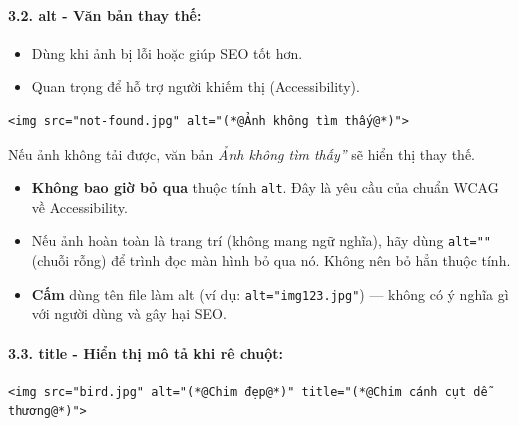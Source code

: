 \documentclass[11pt,oneside]{book}
\newcommand{\codeinline}[1]{\textcolor{accentOrange}{\texttt{#1}}}
\begin{document}
\paragraph{3.2. alt - Văn bản thay thế:}
\begin{itemize}[leftmargin=1.5em, itemsep=2pt, parsep=0pt]
    \item Dùng khi ảnh bị lỗi hoặc giúp SEO tốt hơn.
    \item Quan trọng để hỗ trợ người khiếm thị (Accessibility).
\end{itemize}

\begin{codeWindow}
\begin{lstlisting}[language=HTML5]
<img src="not-found.jpg" alt="(*@Ảnh không tìm thấy@*)">
\end{lstlisting}
\end{codeWindow}

Nếu ảnh không tải được, văn bản \textit{\codeinline{}Ảnh không tìm thấy''} sẽ hiển thị thay thế.

\begin{warnBox}
\begin{itemize}[leftmargin=1.5em, itemsep=2pt, parsep=0pt]
    \item \textbf{Không bao giờ bỏ qua} thuộc tính \codeinline{alt}. Đây là yêu cầu của chuẩn WCAG về Accessibility.
    \item Nếu ảnh hoàn toàn là trang trí (không mang ngữ nghĩa), hãy dùng \codeinline{alt=""} (chuỗi rỗng) để trình đọc màn hình bỏ qua nó. Không nên bỏ hẳn thuộc tính.
    \item \textbf{Cấm} dùng tên file làm alt (ví dụ: \codeinline{alt="img123.jpg"}) — không có ý nghĩa gì với người dùng và gây hại SEO.
\end{itemize}
\end{warnBox}

\paragraph{3.3. title - Hiển thị mô tả khi rê chuột:}
\begin{codeWindow}
\begin{lstlisting}[language=HTML5]
<img src="bird.jpg" alt="(*@Chim đẹp@*)" title="(*@Chim cánh cụt dễ thương@*)">
\end{lstlisting}
\end{codeWindow}
\end{document}
